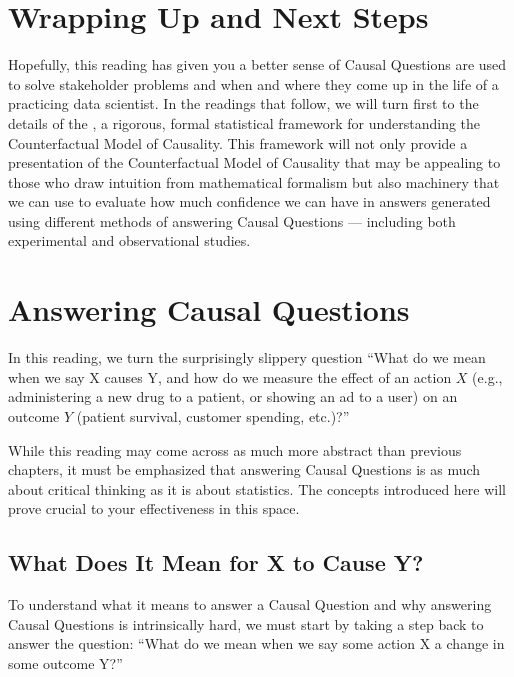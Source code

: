 \documentclass[letterpaper,10pt,english]{jupyterBook}
\begin{document}
\section{Wrapping Up and Next Steps}
\label{\detokenize{30_questions/35_using_causal_questions:wrapping-up-and-next-steps}}
\sphinxAtStartPar
Hopefully, this reading has given you a better sense of  Causal Questions are used to solve stakeholder problems and when and where they come up in the life of a practicing data scientist. In the readings that follow, we will turn first to the details of the , a rigorous, formal statistical framework for understanding the Counterfactual Model of Causality. This framework will not only provide a presentation of the Counterfactual Model of Causality that may be appealing to those who draw intuition from mathematical formalism but also machinery that we can use to evaluate how much confidence we can have in answers generated using different methods of answering Causal Questions — including both experimental and observational studies.

\sphinxstepscope


\section{Answering Causal Questions}
\label{\detokenize{30_questions/40_answering_causal_questions:answering-causal-questions}}\label{\detokenize{30_questions/40_answering_causal_questions::doc}}
\sphinxAtStartPar
In this reading, we turn the surprisingly slippery question “What do we mean when we say X causes Y, and how do we measure the effect of an action \(X\) (e.g., administering a new drug to a patient, or showing an ad to a user) on an outcome \(Y\) (patient survival, customer spending, etc.)?”

\sphinxAtStartPar
While this reading may come across as much more abstract than previous chapters, it must be emphasized that answering Causal Questions is as much about critical thinking as it is about statistics. The concepts introduced here will prove crucial to your effectiveness in this space.


\subsection{What Does It Mean for X to Cause Y?}
\label{\detokenize{30_questions/40_answering_causal_questions:what-does-it-mean-for-x-to-cause-y}}
\sphinxAtStartPar
To understand what it means to answer a Causal Question and why answering Causal Questions is intrinsically hard, we must start by taking a step back to answer the question: “What do we mean when we say some action X  a change in some outcome Y?”
\end{document}
